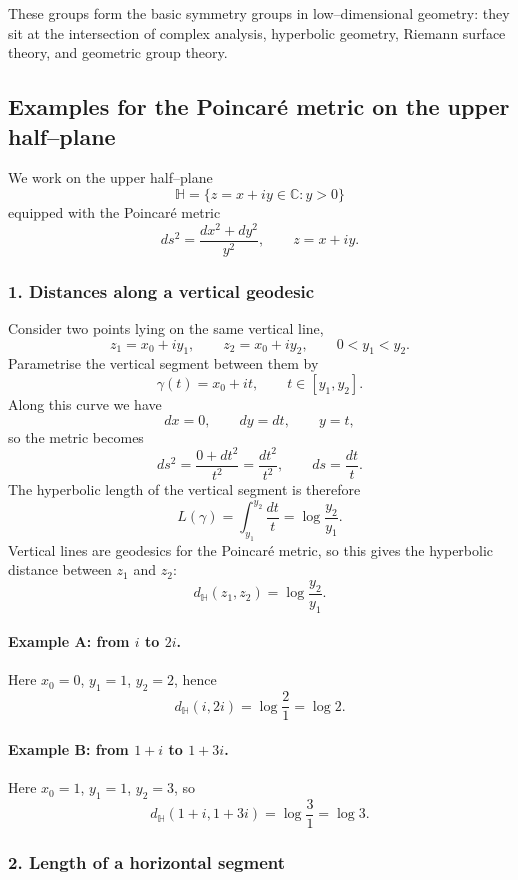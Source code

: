 \documentclass[12pt,a4paper]{article}
\theoremstyle{plain}
\theoremstyle{definition}      %
\begin{document}
These groups form the basic symmetry groups in low–dimensional geometry:
they sit at the intersection of complex analysis, hyperbolic geometry,
Riemann surface theory, and geometric group theory.

\subsection*{Examples for the Poincaré metric on the upper half--plane}

We work on the upper half--plane
\[
\mathbb H = \{ z=x+iy \in \mathbb C : y>0\}
\]
equipped with the Poincaré metric
\[
ds^{2} = \frac{dx^{2} + dy^{2}}{y^{2}},
\qquad z = x + i y.
\]

\subsubsection*{1. Distances along a vertical geodesic}

Consider two points lying on the same vertical line,
\[
z_{1} = x_{0} + i y_{1}, \qquad
z_{2} = x_{0} + i y_{2}, \qquad
0 < y_{1} < y_{2}.
\]
Parametrise the vertical segment between them by
\[
\gamma(t) = x_{0} + i t, \qquad t\in[y_{1},y_{2}].
\]
Along this curve we have
\[
dx = 0, \qquad dy = dt, \qquad y = t,
\]
so the metric becomes
\[
ds^{2} = \frac{0 + dt^{2}}{t^{2}} = \frac{dt^{2}}{t^{2}},
\qquad ds = \frac{dt}{t}.
\]
The hyperbolic length of the vertical segment is therefore
\[
L(\gamma)
= \int_{y_{1}}^{y_{2}} \frac{dt}{t}
= \log\frac{y_{2}}{y_{1}}.
\]
Vertical lines are geodesics for the Poincaré metric, so this gives the
hyperbolic distance between $z_{1}$ and $z_{2}$:
\[
d_{\mathbb H}(z_{1},z_{2}) = \log\frac{y_{2}}{y_{1}}.
\]

\paragraph{Example A: from $i$ to $2i$.}
Here $x_{0}=0$, $y_{1}=1$, $y_{2}=2$, hence
\[
d_{\mathbb H}(i,2i) = \log\frac{2}{1} = \log 2.
\]

\paragraph{Example B: from $1+i$ to $1+3i$.}
Here $x_{0}=1$, $y_{1}=1$, $y_{2}=3$, so
\[
d_{\mathbb H}(1+i,1+3i) = \log\frac{3}{1} = \log 3.
\]

\subsubsection*{2. Length of a horizontal segment}
\end{document}
